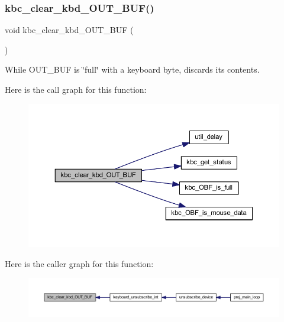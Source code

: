 \subsubsection{\texorpdfstring{kbc\+\_\+clear\+\_\+kbd\+\_\+\+O\+U\+T\+\_\+\+B\+U\+F()}{kbc\_clear\_kbd\_OUT\_BUF()}}
{\footnotesize\ttfamily void kbc\+\_\+clear\+\_\+kbd\+\_\+\+O\+U\+T\+\_\+\+B\+UF (\begin{DoxyParamCaption}{ }\end{DoxyParamCaption})}



While O\+U\+T\+\_\+\+B\+UF is \char`\"{}full\char`\"{} with a keyboard byte, discards its contents. 

Here is the call graph for this function\+:\nopagebreak
\begin{figure}[H]
\begin{center}
\leavevmode
\includegraphics[width=350pt]{group__keyboard_gaf87a23192c923b92891892df893963b7_cgraph}
\end{center}
\end{figure}
Here is the caller graph for this function\+:\nopagebreak
\begin{figure}[H]
\begin{center}
\leavevmode
\includegraphics[width=350pt]{group__keyboard_gaf87a23192c923b92891892df893963b7_icgraph}
\end{center}
\end{figure}
\mbox{\label{group__keyboard_ga3c87ba94c8bab09066553ba6d89c07c8}} 
